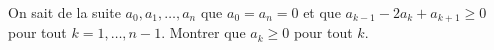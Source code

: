 On sait de la suite $a_0, a_1, \ldots, a_n$ que $a_0 = a_n = 0$ et que $a_{k-1} - 2a_k + a_{k+1} \geq 0$ pour tout $k = 1, \ldots, n-1$. Montrer que $a_k \geq 0$ pour tout $k$.
